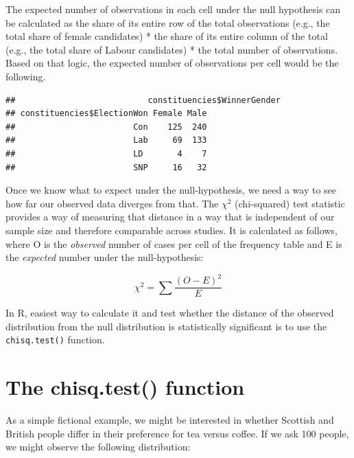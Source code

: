 \documentclass[
]{book}
\newenvironment{Shaded}{\begin{snugshade}}{\end{snugshade}}
\newcommand{\KeywordTok}[1]{\textcolor[rgb]{0.13,0.29,0.53}{\textbf{#1}}}
\newcommand{\NormalTok}[1]{#1}
\newcommand{\OperatorTok}[1]{\textcolor[rgb]{0.81,0.36,0.00}{\textbf{#1}}}
\begin{document}
The expected number of observations in each cell under the null hypothesis can be calculated as the share of its entire row of the total observations (e.g., the total share of female candidates) * the share of its entire column of the total (e.g., the total share of Labour candidates) * the total number of observations. Based on that logic, the expected number of observations per cell would be the following.

\begin{verbatim}
##                           constituencies$WinnerGender
## constituencies$ElectionWon Female Male
##                        Con    125  240
##                        Lab     69  133
##                        LD       4    7
##                        SNP     16   32
\end{verbatim}

Once we know what to expect under the null-hypothesis, we need a way to see how far our observed data diverges from that. The \(\chi^2\) (chi-squared) test statistic provides a way of measuring that distance in a way that is independent of our sample size and therefore comparable across studies. It is calculated as follows, where O is the \emph{observed} number of cases per cell of the frequency table and E is the \emph{expected} number under the null-hypothesis:

\[\chi^2=\sum\frac{(O-E)^2}E\]

In R, easiest way to calculate it and test whether the distance of the observed distribution from the null distribution is statistically significant is to use the \texttt{chisq.test()} function.

\hypertarget{the-chisq.test-function}{%
\section{The chisq.test() function}\label{the-chisq.test-function}}

As a simple fictional example, we might be interested in whether Scottish and British people differ in their preference for tea versus coffee. If we ask 100 people, we might observe the following distribution:

\begin{Shaded}
\end{Shaded}
\end{document}
